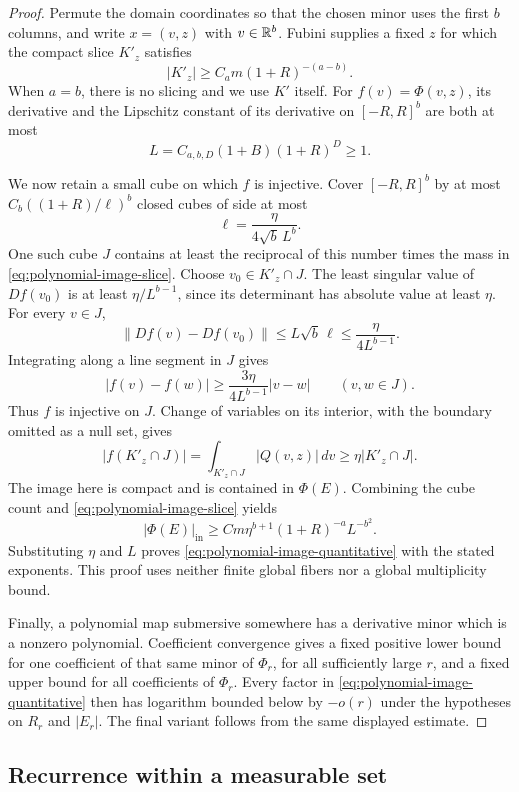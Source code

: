 \begin{proof}
Permute the domain coordinates so that the chosen minor uses the
first $b$ columns, and write $x=(v,z)$ with $v\in\mathbb R^b$.
Fubini supplies a fixed $z$ for which the compact slice $K'_z$
satisfies
\begin{equation}
\label{eq:polynomial-image-slice}
 |K'_z|\ge C_a m(1+R)^{-(a-b)}.
\end{equation}
When $a=b$, there is no slicing and we use $K'$ itself.
For $f(v)=\Phi(v,z)$, its derivative and the Lipschitz constant of its
derivative on $[-R,R]^b$ are both at most
\[
 L=C_{a,b,D}(1+B)(1+R)^D\ge1.
\]

We now retain a small cube on which $f$ is injective.
Cover $[-R,R]^b$ by at most
$C_b((1+R)/\ell)^b$ closed cubes of side at most
\[
 \ell=\frac{\eta}{4\sqrt b\,L^b}.
\]
One such cube $J$ contains at least the reciprocal of this number
times the mass in \eqref{eq:polynomial-image-slice}.  Choose
$v_0\in K'_z\cap J$.  The least singular value of $Df(v_0)$ is at
least $\eta/L^{b-1}$, since its determinant has absolute value at
least $\eta$.  For every $v\in J$,
\[
 \|Df(v)-Df(v_0)\|
 \le L\sqrt b\,\ell
 \le\frac{\eta}{4L^{b-1}}.
\]
Integrating along a line segment in $J$ gives
\[
 |f(v)-f(w)|\ge\frac{3\eta}{4L^{b-1}}|v-w|
       \qquad(v,w\in J).
\]
Thus $f$ is injective on $J$.  Change of variables on its interior,
with the boundary omitted as a null set, gives
\[
 |f(K'_z\cap J)|
   =\int_{K'_z\cap J}|Q(v,z)|\,dv
   \ge\eta |K'_z\cap J|.
\]
The image here is compact and is contained in $\Phi(E)$.  Combining
the cube count and \eqref{eq:polynomial-image-slice} yields
\[
 |\Phi(E)|_{\mathrm{in}}
 \ge C m\eta^{b+1}(1+R)^{-a}L^{-b^2}.
\]
Substituting $\eta$ and $L$ proves
\eqref{eq:polynomial-image-quantitative} with the stated exponents.
This proof uses neither finite global fibers nor a global
multiplicity bound.

Finally, a polynomial map submersive somewhere has a derivative
minor which is a nonzero polynomial.  Coefficient convergence gives
a fixed positive lower bound for one coefficient of that same minor
of $\Phi_r$, for all sufficiently large $r$, and a fixed upper bound
for all coefficients of $\Phi_r$.  Every factor in
\eqref{eq:polynomial-image-quantitative} then has logarithm bounded
below by $-o(r)$ under the hypotheses on $R_r$ and $|E_r|$.
The final variant follows from the same displayed estimate.
\end{proof}

\subsection{Recurrence within a measurable set}

